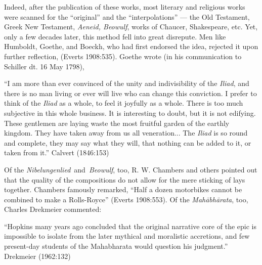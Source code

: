 Indeed, after the publication of these works, most literary and religious works were scanned for the “original” and the “interpolations” --- the Old Testament, Greek New Testament, {\sl Aeneid, Beowulf}, works of Chaucer, Shakespeare, etc. Yet, only a few decades later, this method fell into great disrepute. Men like Humboldt, Goethe, and Boeckh, who had first endorsed the idea, rejected it upon further reflection, (Everts 1908:535). Goethe wrote (in his communication to Schiller dt. 16 May 1798),

\begin{myquote}
“I am more than ever convinced of the unity and indivisibility of the {\sl Iliad}, and there is no man living or ever will live who can change this conviction. I prefer to think of the {\sl Iliad} as a whole, to feel it joyfully as a whole. There is too much subjective in this whole business. It is interesting to doubt, but it is not edifying. These gentlemen are laying waste the most fruitful garden of the earthly kingdom. They have taken away from us all veneration... The {\sl Iliad} is so round and complete, they may say what they will, that nothing can be added to it, or taken from it.”
\hfill Calvert (1846:153)
\end{myquote}

Of the {\sl Nibelungenlied} and {\sl Beowulf}, too, R. W. Chambers and others pointed out that the quality of the compositions do not allow for the mere sticking of lays together. Chambers famously remarked, “Half a dozen motorbikes cannot be combined to make a Rolls-Royce” (Everts 1908:553). Of the {\sl Mahābhārata}, too, Charles Drekmeier commented:

\begin{myquote}
“Hopkins many years ago concluded that the original narrative core of the epic is impossible to isolate from the later mythical and moralistic accretions, and few present-day students of the Mahabharata would question his judgment.”
\hfill Drekmeier (1962:132)
\end{myquote}

